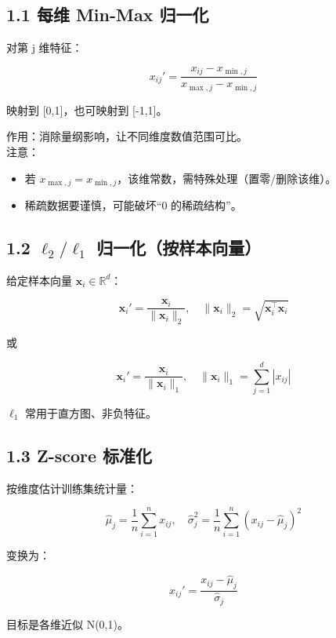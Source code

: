 \documentclass[
]{article}
\providecommand{\tightlist}{%
  \setlength{\itemsep}{0pt}\setlength{\parskip}{0pt}}
\begin{document}
\subsection{1.1 每维 Min-Max
归一化}\label{ux6bcfux7ef4-min-max-ux5f52ux4e00ux5316}

对第 j 维特征：

\[
x_{ij}'=\frac{x_{ij}-x_{\min,j}}{x_{\max,j}-x_{\min,j}}
\]

映射到 {[}0,1{]}，也可映射到 {[}-1,1{]}。

作用：消除量纲影响，让不同维度数值范围可比。\\
注意：

\begin{itemize}
\tightlist
\item
  若 \(x_{\max,j}=x_{\min,j}\)，该维常数，需特殊处理（置零/删除该维）。
\item
  稀疏数据要谨慎，可能破坏``0 的稀疏结构''。
\end{itemize}

\subsection{\texorpdfstring{1.2 \(\ell_2/\ell_1\)
归一化（按样本向量）}{1.2 \textbackslash ell\_2/\textbackslash ell\_1 归一化（按样本向量）}}\label{ell_2ell_1-ux5f52ux4e00ux5316ux6309ux6837ux672cux5411ux91cf}

给定样本向量 \(\mathbf{x}_i\in\mathbb{R}^d\)：

\[
\mathbf{x}_i'=\frac{\mathbf{x}_i}{\|\mathbf{x}_i\|_2},\quad
\|\mathbf{x}_i\|_2=\sqrt{\mathbf{x}_i^\top\mathbf{x}_i}
\]

或

\[
\mathbf{x}_i'=\frac{\mathbf{x}_i}{\|\mathbf{x}_i\|_1},\quad
\|\mathbf{x}_i\|_1=\sum_{j=1}^d |x_{ij}|
\]

\(\ell_1\) 常用于直方图、非负特征。

\subsection{1.3 Z-score 标准化}\label{z-score-ux6807ux51c6ux5316}

按维度估计训练集统计量：

\[
\hat\mu_j=\frac{1}{n}\sum_{i=1}^n x_{ij},\quad
\hat\sigma_j^2=\frac{1}{n}\sum_{i=1}^n (x_{ij}-\hat\mu_j)^2
\]

变换为：

\[
x_{ij}'=\frac{x_{ij}-\hat\mu_j}{\hat\sigma_j}
\]

目标是各维近似 N(0,1)。
\end{document}
